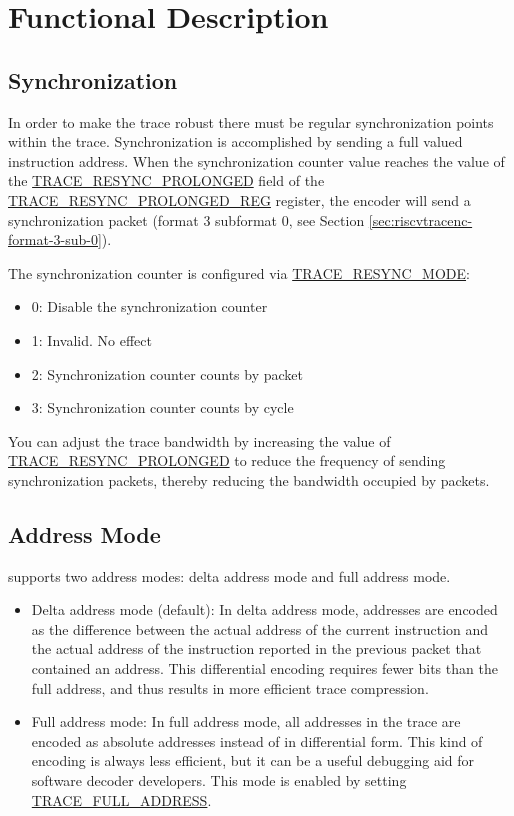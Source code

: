 \documentclass[main\_\_EN.tex]{subfiles}
\begin{document}
\section{Functional Description}
\label{sec:riscvtracenc-func-desc}

\subsection{Synchronization}

In order to make the trace robust there must be regular synchronization points within the trace. Synchronization is accomplished by sending a full valued instruction address. When the synchronization counter value reaches the value of the \hyperref[fielddesc:TRACERESYNCPROLONGED]{TRACE\_RESYNC\_PROLONGED} field of the \hyperref[regdesc:TRACERESYNCPROLONGEDREG]{TRACE\_RESYNC\_PROLONGED\_REG} register, the encoder will send a synchronization packet (format 3 subformat 0, see Section \ref{sec:riscvtracenc-format-3-sub-0}).

The synchronization counter is configured via \hyperref[fielddesc:TRACERESYNCMODE]{TRACE\_RESYNC\_MODE}:
\begin{itemize}
    \item 0: Disable the synchronization counter
    \item 1: Invalid. No effect
    \item 2: Synchronization counter counts by packet
    \item 3: Synchronization counter counts by cycle
\end{itemize}

You can adjust the trace bandwidth by increasing the value of \hyperref[fielddesc:TRACERESYNCPROLONGED]{TRACE\_RESYNC\_PROLONGED} to reduce the frequency of sending synchronization packets, thereby reducing the bandwidth occupied by packets.

\subsection{Address Mode}

\chipname{} supports two address modes: delta address mode and full address mode.
\begin{itemize}
    \item Delta address mode (default): In delta address mode, addresses are encoded as the difference between the actual address of the current instruction and the actual address of the instruction reported in the previous packet that contained an address. This differential encoding requires fewer bits than the full address, and thus results in more efficient trace compression.
    \item Full address mode: In full address mode, all addresses in the trace are encoded as absolute addresses instead of in differential form. This kind of encoding is always less efficient, but it can be a useful debugging aid for software decoder developers. This mode is enabled by setting \hyperref[fielddesc:TRACEFULLADDRESS]{TRACE\_FULL\_ADDRESS}.
\end{itemize}
\end{document}
